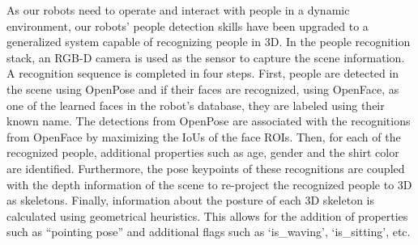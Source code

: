 \label{sec:pers_recog}
As our robots need to operate and interact with people in a dynamic environment, our robots’ people detection skills have been upgraded to a generalized system capable of recognizing people in 3D.
In the people recognition stack, an RGB-D camera is used as the sensor to capture the scene information. A recognition sequence is completed in four steps. First, people are detected in the scene using OpenPose and if their faces are recognized, using OpenFace, as one of the learned faces in the robot's database, they are labeled using their known name.
The detections from OpenPose are associated with the recognitions from OpenFace by maximizing the IoUs of the face ROIs. Then, for each of the recognized people, additional properties such as age, gender and the shirt color are identified. Furthermore, the pose keypoints of these recognitions are coupled with the depth information of the scene to re-project the recognized people to 3D as skeletons. Finally, information about the posture of each 3D skeleton is calculated using geometrical heuristics.
This allows for the addition of properties such as “pointing pose” and additional flags such as `is\_waving', `is\_sitting', etc.
%
